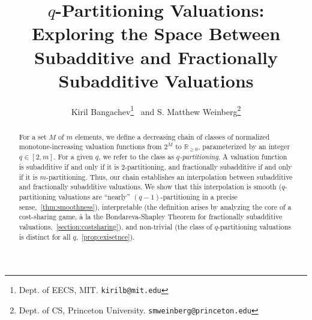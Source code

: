 \documentclass[11pt]{article}%
\author{Kiril Bangachev\thanks{Dept. of EECS, MIT. \texttt{kirilb@mit.edu} } \ and S. Matthew Weinberg\thanks{Dept. of CS, Princeton University. \texttt{smweinberg@princeton.edu}}}
\title{$q$-Partitioning Valuations: Exploring the Space Between\\
Subadditive and Fractionally Subadditive Valuations}
\numberwithin{theorem}{subsection}
\begin{document}
\maketitle
\begin{abstract}

For a set $M$ of $m$ elements, we define a decreasing chain of classes of normalized monotone-increasing valuation functions from $2^M$ to $\mathbb{R}_{\geq 0}$, parameterized by an integer $q \in [2,m]$. For a given $q$, we refer to the class as \emph{$q$-partitioning}. A valuation function is subadditive if and only if it is $2$-partitioning, and fractionally subadditive if and only if it is $m$-partitioning. Thus, our chain establishes an interpolation between subadditive and fractionally subadditive valuations. We show that this interpolation is smooth ($q$-partitioning valuations are ``nearly'' $(q-1)$-partitioning in a precise sense,~\cref{thm:smoothness}), interpretable (the definition arises by analyzing the core of a cost-sharing game, \`{a} la the Bondareva-Shapley Theorem for fractionally subadditive valuations,~\cref{section:costsharing}), and non-trivial (the class of $q$-partitioning valuations is distinct for all $q$,~\cref{prop:exisetnce}).


\end{abstract}
\end{document}
